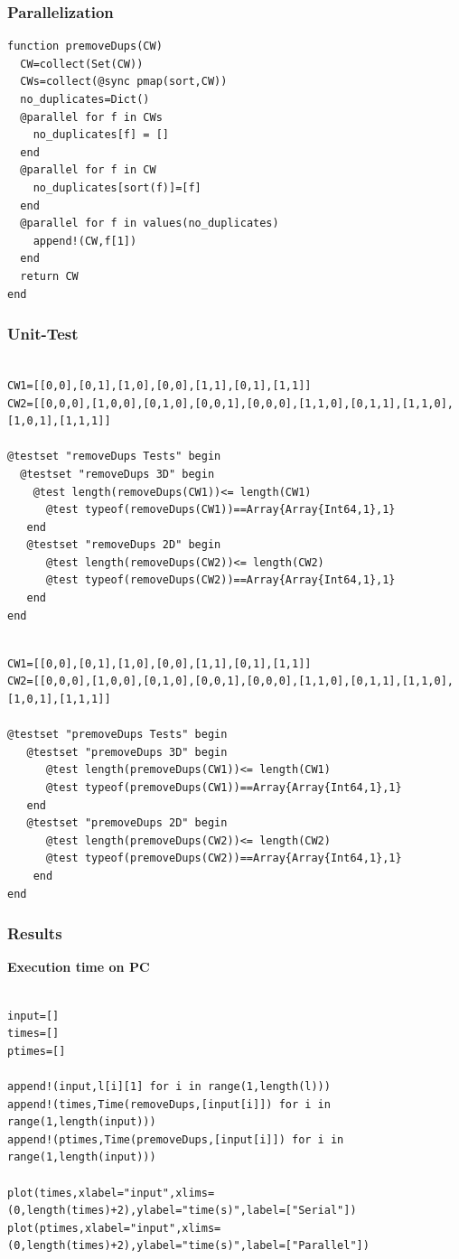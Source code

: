 \documentclass[a4paper,12pt]{article}
\begin{document}
\subsubsection{Parallelization}
\begin{Verbatim}[fontsize=\footnotesize]
function premoveDups(CW)
  CW=collect(Set(CW))
  CWs=collect(@sync pmap(sort,CW))
  no_duplicates=Dict()
  @parallel for f in CWs
    no_duplicates[f] = []
  end
  @parallel for f in CW
    no_duplicates[sort(f)]=[f]
  end
  @parallel for f in values(no_duplicates)
    append!(CW,f[1])
  end
  return CW
end
\end{Verbatim}
\subsubsection{Unit-Test}
\begin{Verbatim}[fontsize=\footnotesize]

CW1=[[0,0],[0,1],[1,0],[0,0],[1,1],[0,1],[1,1]]
CW2=[[0,0,0],[1,0,0],[0,1,0],[0,0,1],[0,0,0],[1,1,0],[0,1,1],[1,1,0],[1,0,1],[1,1,1]]

@testset "removeDups Tests" begin
  @testset "removeDups 3D" begin
    @test length(removeDups(CW1))<= length(CW1)
      @test typeof(removeDups(CW1))==Array{Array{Int64,1},1}
   end
   @testset "removeDups 2D" begin
      @test length(removeDups(CW2))<= length(CW2)
      @test typeof(removeDups(CW2))==Array{Array{Int64,1},1}
   end
end

\end{Verbatim}
\begin{Verbatim}[fontsize=\footnotesize]

CW1=[[0,0],[0,1],[1,0],[0,0],[1,1],[0,1],[1,1]]
CW2=[[0,0,0],[1,0,0],[0,1,0],[0,0,1],[0,0,0],[1,1,0],[0,1,1],[1,1,0],[1,0,1],[1,1,1]]

@testset "premoveDups Tests" begin
   @testset "premoveDups 3D" begin
      @test length(premoveDups(CW1))<= length(CW1)
      @test typeof(premoveDups(CW1))==Array{Array{Int64,1},1}
   end
   @testset "premoveDups 2D" begin
      @test length(premoveDups(CW2))<= length(CW2)
      @test typeof(premoveDups(CW2))==Array{Array{Int64,1},1}
    end
end
\end{Verbatim}

\subsubsection{Results}
\textbf{Execution time on PC}
\begin{Verbatim}[fontsize=\footnotesize]

input=[]
times=[]
ptimes=[]

append!(input,l[i][1] for i in range(1,length(l)))
append!(times,Time(removeDups,[input[i]]) for i in range(1,length(input)))
append!(ptimes,Time(premoveDups,[input[i]]) for i in range(1,length(input)))

plot(times,xlabel="input",xlims=(0,length(times)+2),ylabel="time(s)",label=["Serial"])
plot(ptimes,xlabel="input",xlims=(0,length(times)+2),ylabel="time(s)",label=["Parallel"])

\end{Verbatim}
\end{document}
